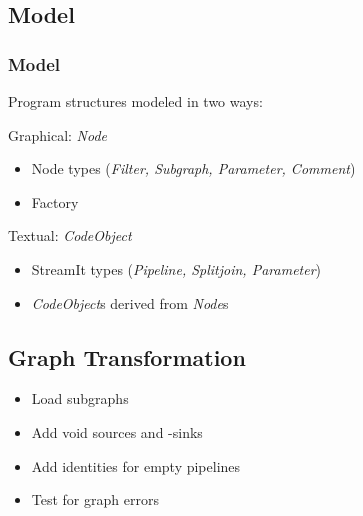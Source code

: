 \documentclass{beamer}
\begin{document}
\subsection{Model}
\begin{frame}
\frametitle{Model}
Program structures modeled in two ways:
\begin{block}{Graphical: \textit{Node}}
	\begin{itemize}
		\item Node types (\textit{Filter, Subgraph, Parameter, Comment})
		\item Factory
	\end{itemize}
\end{block}
\begin{block}{Textual: \textit{CodeObject}}
	\begin{itemize}
		\item StreamIt types (\textit{Pipeline, Splitjoin, Parameter})
		\item \textit{CodeObject}s derived from \textit{Node}s
	\end{itemize}
\end{block}
\end{frame}

\subsection{Graph Transformation}
\begin{frame}
	\begin{itemize}
		\item Load subgraphs
		\item Add void sources and -sinks
		\item Add identities for empty pipelines
		\item Test for graph errors %
	\end{itemize}
\end{frame}

\end{document}
